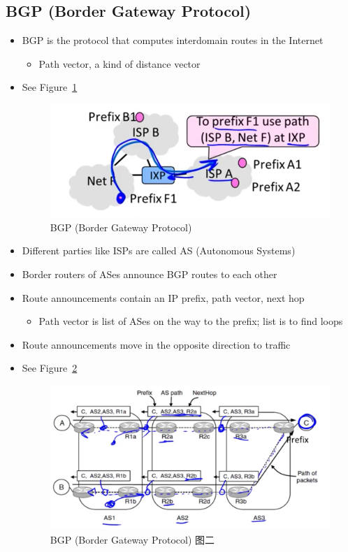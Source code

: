 \documentclass[12pt]{ctexart}   %
\begin{document}
	\subsection{BGP (Border Gateway Protocol)}
	\begin{itemize}
		\item BGP is the protocol that computes interdomain routes in the Internet
		\begin{itemize}
			\item Path vector, a kind of distance vector
		\end{itemize}
		\item See Figure~\ref{fig:5-12-3}
			
		\begin{figure}[h!] %
		\centering
		 \includegraphics[scale=0.7]{images/5-12-3}
		\caption{ BGP (Border Gateway Protocol) }
		 \label{fig:5-12-3}
		 \end{figure}
		 
		 \item Different parties like ISPs are called AS (Autonomous Systems)
		 \item Border routers of ASes announce BGP routes to each other
		 \item Route announcements contain an IP prefix, path vector, next hop
		 \begin{itemize}
		 	\item Path vector is list of ASes on the way to the prefix; list is to find loops
		 \end{itemize}
		 \item Route announcements move in the opposite direction to traffic
		 \item See Figure~\ref{fig:5-12-4}
			
		\begin{figure}[h!] %
		\centering
		 \includegraphics[scale=0.7]{images/5-12-4}
		\caption{ BGP (Border Gateway Protocol) 图二 }
		 \label{fig:5-12-4}
		 \end{figure}
		 

\end{itemize}
\end{document}
